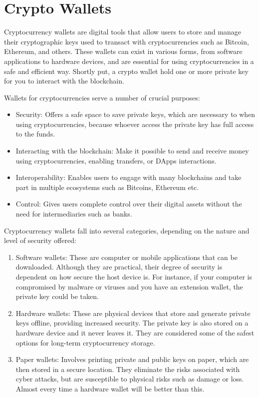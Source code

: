  \section{Crypto Wallets}
 \label{sec:ch2sec4}
\par  Cryptocurrency wallets are digital tools that allow users to store and manage their cryptographic keys used to transact with cryptocurrencies such as Bitcoin, Ethereum, and others. These wallets can exist in various forms, from software applications to hardware devices, and are essential for using cryptocurrencies in a safe and efficient way. Shortly put, a crypto wallet hold one or more private key for you to interact with the blockchain.
\par Wallets for cryptocurrencies serve a number of crucial purposes:
\begin{itemize}
	\item Security: Offers a safe space to save private keys, which are necessary to when using cryptocurrencies, because whoever access the private key has full access to the funds.
	\item Interacting with the blockchain: Make it possible to send and receive money using cryptocurrencies, enabling transfers, or DApps interactions.
	\item Interoperability: Enables users to engage with many blockchains and take part in multiple ecosystems such as Bitcoins, Ethereum etc.
	\item Control: Gives users complete control over their digital assets without the need for intermediaries such as banks.
\end{itemize}
\par Cryptocurrency wallets fall into several categories, depending on the nature and level of security offered:
\begin{enumerate}
	\item Software wallets: These are computer or mobile applications that can be downloaded. Although they are practical, their degree of security is dependent on how secure the host device is. For instance, if your computer is compromised by malware or viruses and you have an extension wallet, the private key could be taken.
	\item Hardware wallets: These are physical devices that store and generate private keys offline, providing increased security. The private key is also stored on a hardware device and it never leaves it. They are considered some of the safest options for long-term cryptocurrency storage.
	\item Paper wallets: Involves printing private and public keys on paper, which are then stored in a secure location. They eliminate the risks associated with cyber attacks, but are susceptible to physical risks such as damage or loss. Almost every time a hardware wallet will be better than this.
\end{enumerate}

